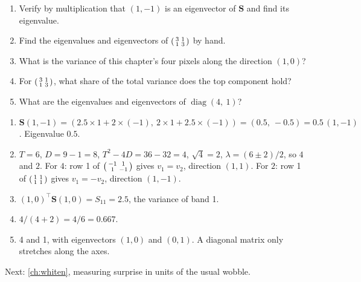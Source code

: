\documentclass[11pt,a4paper,oneside,openany]{book}
\newcommand{\B}[1]{{\symbf{#1}}}
\newcommand{\B}[1]{{\bm{#1}}}
\newcommand{\T}{^{\top}}
\newcommand{\mS}{\B{S}}
\newcommand{\nextchapter}[1]{\par\medskip\noindent\hfill\textsf{\small Next: #1}\par}
\begin{document}
\begin{checkyourself}
\begin{enumerate}
\item Verify by multiplication that $(1,-1)$ is an eigenvector of $\mS$ and find its eigenvalue.
\item Find the eigenvalues and eigenvectors of $\begin{psmallmatrix}3&1\\1&3\end{psmallmatrix}$ by hand.
\item What is the variance of this chapter's four pixels along the direction $(1,0)$?
\item For $\begin{psmallmatrix}3&1\\1&3\end{psmallmatrix}$, what share of the total variance does the top component hold?
\item What are the eigenvalues and eigenvectors of $\operatorname{diag}(4,\ 1)$?
\end{enumerate}
\end{checkyourself}

\begin{answers}
\begin{enumerate}
\item $\mS(1,-1)=(2.5\times1+2\times(-1),\ 2\times1+2.5\times(-1))=(0.5,\ -0.5)=0.5\,(1,-1)$. Eigenvalue $0.5$.
\item $T=6$, $D=9-1=8$, $T^2-4D=36-32=4$, $\sqrt4=2$, $\lambda=(6\pm2)/2$, so $4$ and $2$. For $4$: row 1 of
  $\begin{psmallmatrix}-1&1\\1&-1\end{psmallmatrix}$ gives $v_1=v_2$, direction $(1,1)$. For $2$: row 1 of
  $\begin{psmallmatrix}1&1\\1&1\end{psmallmatrix}$ gives $v_1=-v_2$, direction $(1,-1)$.
\item $(1,0)\T\mS(1,0)=S_{11}=2.5$, the variance of band 1.
\item $4/(4+2)=4/6=0.667$.
\item 4 and 1, with eigenvectors $(1,0)$ and $(0,1)$. A diagonal matrix only stretches along the axes.
\end{enumerate}
\end{answers}

\nextchapter{\cref{ch:whiten}, measuring surprise in units of the usual wobble.}
\end{document}

